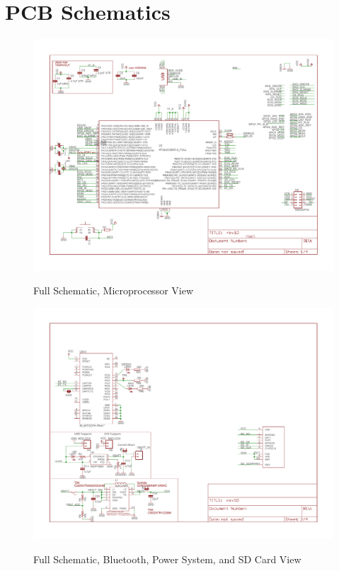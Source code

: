 \chapter*{PCB Schematics}
\begin{figure}
	\begin{center}
		\label{fig:FullSchematic_Sheet1}
		\includegraphics[angle=90,scale=1,width=1\textwidth]{Images/rev1D_sheet1.pdf} 
		\caption{Full Schematic, Microprocessor View}
	\end{center}
\end{figure}

\begin{figure}
	\begin{center}
		\label{fig:FullSchematic_Sheet2}
		\includegraphics[angle=90,scale=1,width=1\textwidth]{Images/rev1D_sheet2.pdf} 
		\caption{Full Schematic, Bluetooth, Power System, and SD Card View}
	\end{center}
\end{figure}

